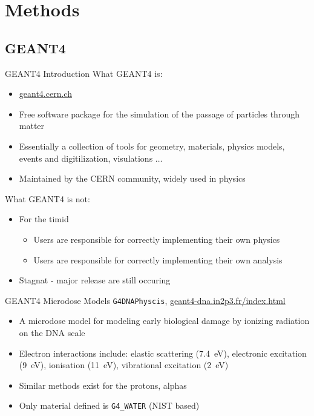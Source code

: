 \documentclass[compress]{beamer}
\begin{document}
\section{Methods}
\subsection{GEANT4}
\begin{frame}[fragile]{GEANT4 Introduction}
What GEANT4 is:
\begin{itemize}
  \small
  \item \href{geant4.cern.ch}{geant4.cern.ch}
  \item Free software package for the simulation of the passage of particles through matter
  \item Essentially a collection of tools for geometry, materials, physics models, events and digitilization, visulations $\dots$
  \item Maintained by the CERN community, widely used in physics
\end{itemize}
What GEANT4 is not:
\begin{itemize}
  \small
  \item For the timid
  \begin{itemize}
    \item Users are responsible for correctly implementing their own physics
    \item Users are responsible for correctly implementing their own analysis
  \end{itemize}
  \item Stagnat - major release are still occuring
\end{itemize}
\end{frame}
\begin{frame}[fragile]{GEANT4 Microdose Models}
\verb+G4DNAPhyscis+, \href{geant4-dna.in2p3.fr}{geant4-dna.in2p3.fr/index.html}
  \begin{itemize}
    \item A microdose model for modeling early biological damage by ionizing radiation on the DNA scale
    \item Electron interactions include: elastic scattering (\SI{7.4}{\eV}), electronic excitation (\SI{9}{\eV}), ionisation (\SI{11}{\eV}), vibrational excitation (\SI{2}{\eV})
    \item Similar methods exist for the protons, alphas
    \item Only material defined is \verb+G4_WATER+ (NIST based)
  \end{itemize}
\end{frame}
\end{document}
